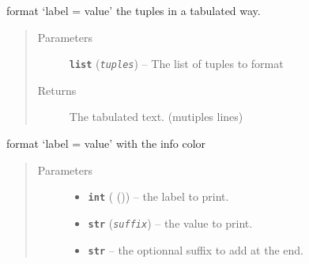 \documentclass[a4paper,10pt,english]{sphinxmanual}
\begin{document}

\begin{fulllineitems}
\label{commands/apidoc/src:src.utilsSat.formatTuples}
format `label = value' the tuples in a tabulated way.
\begin{quote}\begin{description}
\item[{Parameters}] \leavevmode
\textbf{\texttt{list}} (\emph{\texttt{tuples}}) -- The list of tuples to format

\item[{Returns}] \leavevmode
The tabulated text. (mutiples lines)

\end{description}\end{quote}

\end{fulllineitems}


\begin{fulllineitems}
\label{commands/apidoc/src:src.utilsSat.formatValue}
format `label = value' with the info color
\begin{quote}\begin{description}
\item[{Parameters}] \leavevmode\begin{itemize}
\item {} 
\textbf{\texttt{int}} ({\hyperref[commands/apidoc/src:src.utilsSat.label]{}} ()) -- the label to print.

\item {} 
\textbf{\texttt{str}} (\emph{\texttt{suffix}}) -- the value to print.

\item {} 
\textbf{\texttt{str}} -- the optionnal suffix to add at the end.

\end{itemize}

\end{description}\end{quote}

\end{fulllineitems}
\end{document}
